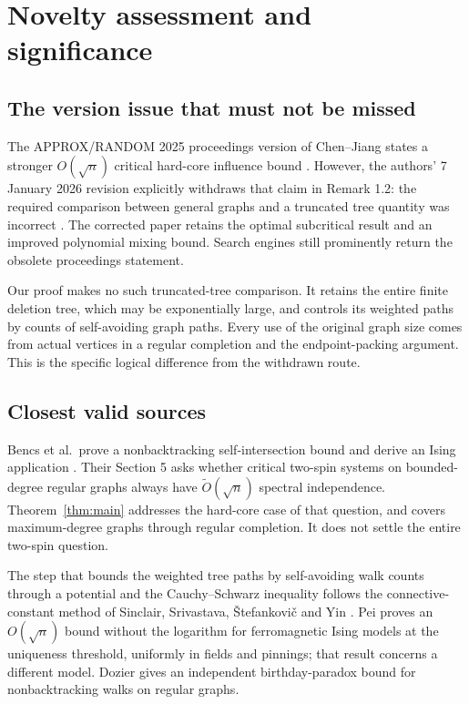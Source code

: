 \documentclass[11pt]{article}
\theoremstyle{definition}
\begin{document}
\section{Novelty assessment and significance}

\subsection{The version issue that must not be missed}

The APPROX/RANDOM 2025 proceedings version of Chen--Jiang states a stronger
$O(\sqrt n)$ critical hard-core influence bound \cite{CJ25}. However, the
authors' 7 January 2026 revision explicitly withdraws that claim in
Remark 1.2: the required comparison between general graphs and a truncated
tree quantity was incorrect \cite{CJ26}. The corrected paper retains the
optimal subcritical result and an improved polynomial mixing bound. Search
engines still prominently return the obsolete proceedings statement.

Our proof makes no such truncated-tree comparison. It retains the entire
finite deletion tree, which may be exponentially large, and controls its
weighted paths by counts of self-avoiding graph paths. Every use of the
original graph size comes from actual vertices in a regular completion and
the endpoint-packing argument. This is the specific logical difference from
the withdrawn route.

\subsection{Closest valid sources}

Bencs et al.\ prove a nonbacktracking self-intersection bound and derive an
Ising application \cite{Bencs}. Their Section 5 asks whether critical
two-spin systems on bounded-degree regular graphs always have
$\widetilde O(\sqrt n)$ spectral independence. Theorem~\ref{thm:main}
addresses the hard-core case of that question, and covers maximum-degree
graphs through regular completion. It does not settle the entire
two-spin question.

The step that bounds the weighted tree paths by self-avoiding walk counts
through a potential and the Cauchy--Schwarz inequality follows the
connective-constant method of Sinclair, Srivastava, \v{S}tefankovi\v{c} and
Yin \cite{SSSY}. Pei \cite{Pei} proves an $O(\sqrt n)$ bound without the
logarithm for ferromagnetic Ising models at the uniqueness threshold,
uniformly in fields and pinnings; that result concerns a different model.
Dozier \cite{Dozier} gives an independent birthday-paradox bound for
nonbacktracking walks on regular graphs.
\end{document}
